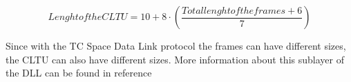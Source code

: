 \begin{equation}
Lenght of the CLTU=10+8\cdot(\frac{Total lenght of the frames+6}{7})
\end{equation} 

Since with the TC Space Data Link protocol the frames can have different sizes, the CLTU can also have different sizes. More information about this sublayer of the DLL can be found in reference \cite{Synchronization2012}